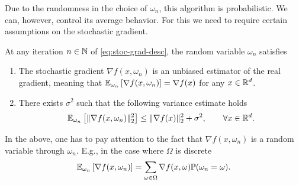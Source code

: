 \documentclass{report}
\begin{document}

Due to the randomness in the choice of $\omega_n$, this algorithm is probabilistic. We can, however, control its average behavior. For this we need to require certain assumptions on the stochastic gradient.

\begin{assumption}
	\label{ass:stoc-grad}
	At any iteration $n\in \mathbb{N}$ of \eqref{eq:stoc-grad-desc}, the random variable $\omega_n$ satisfies
	\begin{enumerate}
		\item The stochastic gradient $\nabla f(x,\omega_n)$ is an unbiased estimator of the real gradient, meaning that $\mathbb{E}_{\omega_n}\left[ \nabla f(x,\omega_n) \right] = \nabla f(x)$ for any $x\in \mathbb{R}^d$.
		\item There exists $\sigma^2$ such that the following variance estimate holds 
		\begin{equation}
			\mathbb{E}_{\omega_n}\left[ \|\nabla f(x,\omega_n)\|_2^2\right] \le \|\nabla f(x)\|_2^2 + \sigma^2,\qquad \forall x\in \mathbb{R}^d.
		\end{equation}
	\end{enumerate}
\end{assumption}

\begin{remark}
	In the above, one has to pay attention to the fact that $\nabla f(x,\omega_n)$ is a random variable through $\omega_n$. E.g., in the case where $\Omega$ is discrete 
	\begin{equation}
		\mathbb{E}_{\omega_n}\left[ \nabla f(x,\omega_n)\right] = \sum_{\omega \in \Omega} \nabla f(x,\omega) \mathbb{P}(\omega_n=\omega).
	\end{equation}
\end{remark}
	
\end{document}
